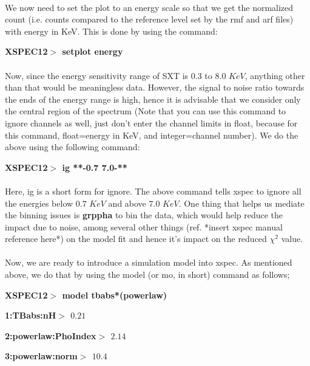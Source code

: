 \documentclass[a4paper,twoside]{report}
\numberwithin{equation}{section}
\begin{document}
\paragraph{}
We now need to set the plot to an energy scale so that we get the normalized count (i.e. counts compared to the reference level set by the rmf and arf files) with energy in KeV. This is done by using the command:
\begin{center}
\item \large \textbf{XSPEC12$>$ setplot energy}
\end{center}
\paragraph{}
Now, since the energy sensitivity range of SXT is $0.3$ to $8.0$ $KeV$, anything other than that would be meaningless data. However, the signal to noise ratio towards the ends of the energy range is high, hence it is advisable that we consider only the central region of the spectrum (Note that you can use this command to ignore channels as well, just don't enter the channel limits in float, because for this command, float=energy in KeV, and integer=channel number). We do the above using the following command:
\begin{center}
\item \large \textbf{XSPEC12$>$ ig **-0.7 7.0-**}
\end{center}
\paragraph{}
Here, ig is a short form for ignore. The above command tells xspec to ignore all the energies below $0.7$ $KeV$ and above $7.0$ $KeV$. One thing that helps us mediate the binning issues is \textbf{grppha} to bin the data, which would help reduce the impact due to noise, among several other things (ref. *insert xspec manual reference here*) on the model fit and hence it's impact on the reduced $\chi^2$ value.
\paragraph{}
Now, we are ready to introduce a simulation model into xspec. As mentioned above, we do that by using the model (or mo, in short) command as follows;
\begin{center}
\item \large \textbf{XSPEC12$>$ model tbabs*(powerlaw)}
\item \large \textbf{1:TBabs:nH$>$ $0.21$}
\item \large \textbf{2:powerlaw:PhoIndex$>$ $2.14$}
\item \large \textbf{3:powerlaw:norm$>$ $10.4$}
\end{center}
\end{document}

